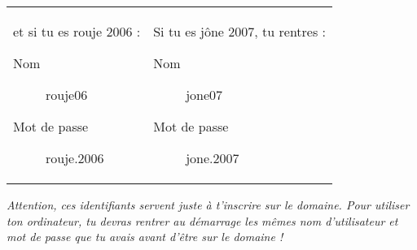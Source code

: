 
\begin{center}
\begin{tabular}{ll}
 \parbox{.45\textwidth}{
  et si tu es rouje 2006 :
  \begin{description}
    \item[Nom] rouje06
    \item[Mot de passe] rouje.2006
  \end{description}
  }
 & \parbox{.45\textwidth}{
  Si tu es j\^one 2007, tu rentres :
  \begin{description}
    \item[Nom] jone07
    \item[Mot de passe] jone.2007
  \end{description}
  }
\\
\end{tabular}
\end{center}

\emph{Attention, ces identifiants servent juste à t'inscrire sur le
domaine. Pour utiliser ton ordinateur, tu devras rentrer au
démarrage les mêmes nom d'utilisateur et mot de passe que tu avais
avant d'être sur le domaine !}








